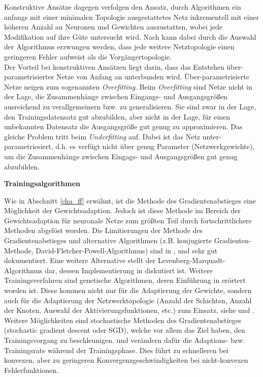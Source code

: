 Konstruktive Ansätze dagegen verfolgen den Ansatz, durch Algorithmen ein anfangs mit einer minimalen Topologie ausgestattetes Netz inkrementell mit einer höheren Anzahl an Neuronen und Gewichten auszustatten, wobei jede Modifikation auf ihre Güte untersucht wird. Nach \cite{Parekh.2000} kann dabei durch die Auswahl der Algorithmus erzwungen werden, dass jede weitere Netztopologie einen geringeren Fehler aufweist als die Vorgängertopologie. \\
Der Vorteil bei konstruktiven Ansätzen liegt darin, dass das Entstehen über-parametrisierter Netze von Anfang an unterbunden wird. Über-parametrisierte Netze neigen zum sogenannten \textit{Overfitting}. Beim \textit{Overfitting} sind Netze nicht in der Lage, die Zusammenhänge zwischen Eingangs- und Ausgangsgrößen ausreichend zu verallgemeinern bzw. zu generalisieren. Sie sind zwar in der Lage, den Trainingsdatensatz gut abzubilden, aber nicht in der Lage, für einen unbekannten Datensatz die Ausgangsgröße gut genug zu approximieren. Das gleiche Problem tritt beim \textit{Underfitting} auf. Dabei ist das Netz unter-parametriesiert, d.h. es verfügt nicht über genug Parameter (Netzwerkgewichte), um die Zusammenhänge zwischen Eingags- und Ausgangsgrößen gut genug abzubilden.


\textbf{Trainingsalgorithmen}

Wie in Abschnitt \ref{cha_ff} erwähnt, ist die Methode des Gradientenabstieges eine Möglichkeit der Gewichtsadaption. Jedoch ist diese Methode im Bereich der Gewichtsadaption für neuronale Netze zum größten Teil durch fortschrittlichere Methoden abgelöst worden. Die Limitierungen der Methode des Gradientenabstieges und alternative Algorithmen (z.B. konjugierte Gradienten-Methode, David-Fletcher-Powell-Algorithmus) sind in \cite{WarrenS.Sarle.1994}, \cite{Masters.1995} und \cite{Bishop.2010} sehr gut dokumentiert. Eine weitere Alternative stellt der Levenberg-Marquadt-Algorithmus dar, dessen Implementierung in \cite{Kollias.March1993} diskutiert ist. Weitere Trainingsverfahren sind genetische Algorithmen, deren Einführung in \cite{Hassoun.1996} erörtert worden ist. Diese kommen nicht nur für die Adaptierung der Gewichte, sondern auch für die Adaptierung der Netzwerktopologie (Anzahl der Schichten, Anzahl der Knoten, Auswahl der Aktivierungsfunktionen, etc.) zum Einsatz, siehe \cite{Bayer.2009} und \cite{StevenA.Harp.1992}.  \\
Weitere Möglichkeiten sind stochastische Methoden des Gradientenabstieges (stochastic gradient descent oder SGD), welche vor allem das Ziel haben, den Trainingsvorgang zu beschleunigen. \cite{JohnDuchi.2010} und \cite{Zeiler.12222012} verändern dafür die Adaptions- bzw. Trainingsrate während der Trainingsphase. Dies führt zu schnelleren bei konvexen, aber zu geringeren Konvergenzgeschwindigkeiten bei nicht-konvexen Fehlerfunktionen. 

